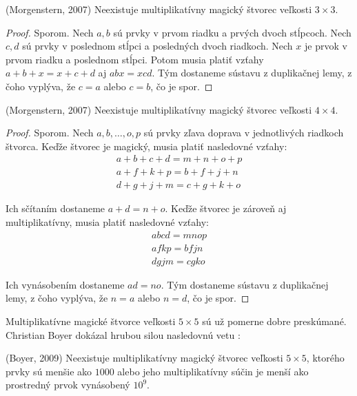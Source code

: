 \begin{theorem} (Morgenstern, 2007) Neexistuje multiplikatívny magický štvorec veľkosti $3 \times 3$.
\end{theorem}

\begin{proof} Sporom. Nech $a,b$ sú prvky v prvom riadku a prvých dvoch stĺpcoch. Nech $c,d$ sú prvky v poslednom stĺpci a posledných dvoch riadkoch. Nech $x$ je prvok v prvom riadku a poslednom stĺpci. Potom musia platiť vzťahy $a + b + x = x + c + d$ aj $abx = xcd$. Tým dostaneme sústavu z duplikačnej lemy, z čoho vyplýva, že $c = a$ alebo $c = b$, čo je spor.
\end{proof}

\begin{theorem} (Morgenstern, 2007) Neexistuje multiplikatívny magický štvorec veľkosti $4 \times 4$.
\end{theorem} 

\begin{proof} Sporom. Nech $a, b, \dots , o, p$ sú prvky zľava doprava v jednotlivých riadkoch štvorca. Keďže štvorec je magický, musia platiť nasledovné vzťahy:
\begin{gather*}
a + b + c + d = m + n + o + p \\
a + f + k + p = b + f + j + n \\
d + g + j + m = c + g + k + o
\end{gather*}

Ich sčítaním dostaneme $a + d = n + o$. Keďže štvorec je zároveň aj multiplikatívny, musia platiť nasledovné vzťahy:
\begin{gather*}
abcd = mnop \\
afkp = bfjn \\
dgjm = cgko
\end{gather*}

Ich vynásobením dostaneme $ad = no$. Tým dostaneme sústavu z duplikačnej lemy, z čoho vyplýva, že $n = a$ alebo $n = d$, čo je spor.
\end{proof}

Multiplikatívne magické štvorce veľkosti $5 \times 5$ sú už pomerne dobre preskúmané. Christian Boyer dokázal hrubou silou nasledovnú vetu \cite{multimagie}:

\begin{theorem} (Boyer, 2009) Neexistuje multiplikatívny magický štvorec veľkosti $5 \times 5$, ktorého prvky sú menšie ako $1000$ alebo jeho multiplikatívny súčin je menší ako prostredný prvok vynásobený $10^9$.
\end{theorem}


